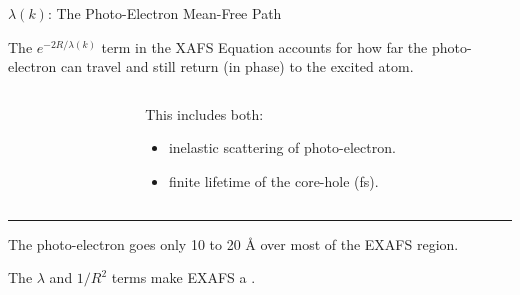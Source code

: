 \begin{slide}{ $\lambda(k)$: The Photo-Electron Mean-Free Path }

  \begin{cenpage}{135mm}

  The $ e^{-2R/\lambda(k)} $ term in the XAFS Equation accounts for how far the
   photo-electron can travel and still return (in phase) to the excited atom.
 \begin{columns}
   \begin{column}{55mm}
   \end{column}
   \begin{column}{60mm}

     This includes both:

     \begin{itemize}
     \item  inelastic scattering of photo-electron.
     \item  finite lifetime of the core-hole (fs).
     \end{itemize}
     \vmm

   \end{column}
 \end{columns}

 \vmm\hrule\vmm

The photo-electron goes only {10 to 20 \AA}  over most of the EXAFS region.

 \begin{postitbox}{80mm}
     The $\lambda$ and $1/R^{2}$ terms make EXAFS a  {}.
   \end{postitbox}

 \end{cenpage}  \end{slide}



